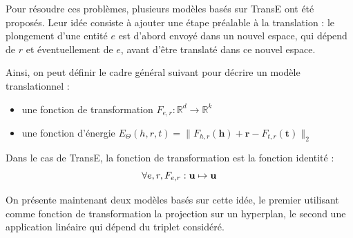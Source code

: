 Pour résoudre ces problèmes, plusieurs modèles basés sur TransE ont été proposés. Leur idée consiste à ajouter une étape préalable à la translation : le plongement d'une entité $e$ est d'abord envoyé dans un nouvel espace, qui dépend de $r$ et éventuellement de $e$, avant d'être translaté dans ce nouvel espace.

Ainsi, on peut définir le cadre général suivant pour décrire un modèle translationnel :
\begin{itemize}
    \item une fonction de transformation $F_{e, r} : \mathbb{R}^d \rightarrow \mathbb{R}^{k}$
    \item une fonction d'énergie $E_\Theta(h, r, t) = \| F_{h, r}(\mathbf{h}) + \mathbf{r} - F_{t, r}(\mathbf{t}) \|_2 $
\end{itemize}

Dans le cas de TransE, la fonction de transformation est la fonction identité :
\begin{equation}
    \forall e, r, F_{e, r} : \bf{u} \mapsto \bf{u}
\end{equation}

On présente maintenant deux modèles basés sur cette idée, le premier utilisant comme fonction de transformation la projection sur un hyperplan, le second une application linéaire qui dépend du triplet considéré.

